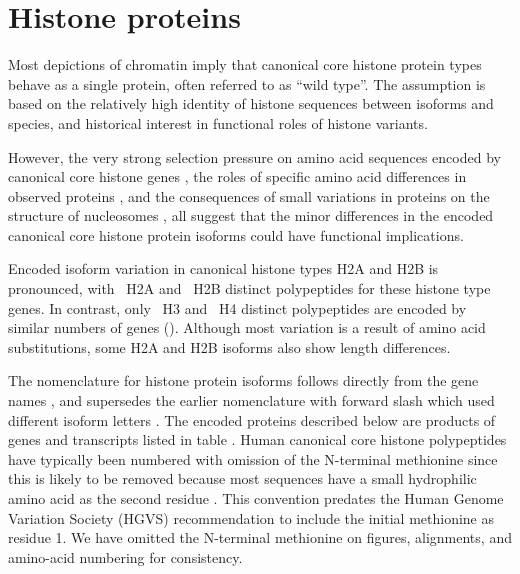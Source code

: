 \section{Histone proteins}
  Most depictions of chromatin imply that
  canonical core histone protein types behave as a single protein,
  often referred to as ``wild type''.
  The assumption is based on the relatively high identity of histone sequences
  between isoforms and species,
  and historical interest in functional roles of histone variants.

  However, the very strong selection pressure on
  amino acid sequences encoded by canonical core histone genes \citep{NeiRooney2005},
  the roles of specific amino acid differences in observed proteins \citep{MazeAllis2014},
  and the consequences of small variations in proteins on the structure of nucleosomes \citep{KurumizakaCOSB2013},
  all suggest that the minor differences in the encoded canonical core histone protein isoforms
  could have functional implications.

  Encoded isoform variation in canonical histone types H2A and H2B is pronounced,
  with \HTwoAUniqueProteins{}~H2A and \HTwoBUniqueProteins{}~H2B distinct polypeptides
  for these histone type genes.
  In contrast, only \HThreeUniqueProteins{}~H3 and \HFourUniqueProteins{}~H4
  distinct polypeptides are encoded by similar numbers of genes ().
  Although most variation is a result of amino acid substitutions,
  some H2A and H2B isoforms also show length differences.

  The nomenclature for histone protein isoforms follows directly
  from the gene names \citep{Marzluff02},
  and supersedes the earlier nomenclature with forward slash which used different isoform letters
  \citep{AlbigGenomics1997,AlbigHumangen1997}.
  The encoded proteins described below are products of genes and transcripts listed
  in table .
  Human canonical core histone polypeptides have typically been numbered
  with omission of the N-terminal methionine
  since this is likely to be removed because most sequences have
  a small hydrophilic amino acid as the second residue \citep{XiaoPeiBiochem2010}.
  This convention predates the Human Genome Variation Society (HGVS) recommendation
  to include the initial methionine as residue 1.
  We have omitted the N-terminal methionine on figures, alignments,
  and amino-acid numbering for consistency.


